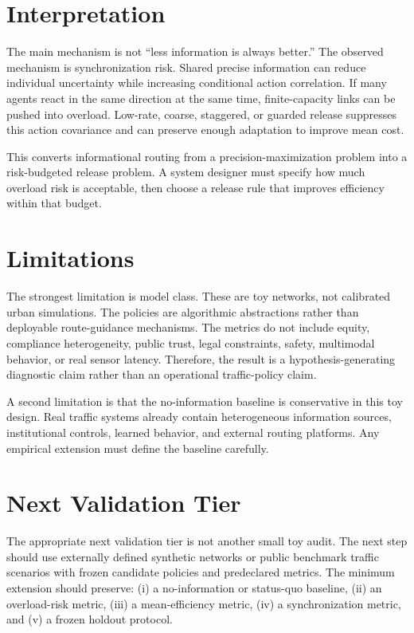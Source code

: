 \documentclass[11pt]{article}
\begin{document}
\section{Interpretation}
The main mechanism is not ``less information is always better.'' The observed mechanism is synchronization risk. Shared precise information can reduce individual uncertainty while increasing conditional action correlation. If many agents react in the same direction at the same time, finite-capacity links can be pushed into overload. Low-rate, coarse, staggered, or guarded release suppresses this action covariance and can preserve enough adaptation to improve mean cost.

This converts informational routing from a precision-maximization problem into a risk-budgeted release problem. A system designer must specify how much overload risk is acceptable, then choose a release rule that improves efficiency within that budget.

\section{Limitations}
The strongest limitation is model class. These are toy networks, not calibrated urban simulations. The policies are algorithmic abstractions rather than deployable route-guidance mechanisms. The metrics do not include equity, compliance heterogeneity, public trust, legal constraints, safety, multimodal behavior, or real sensor latency. Therefore, the result is a hypothesis-generating diagnostic claim rather than an operational traffic-policy claim.

A second limitation is that the no-information baseline is conservative in this toy design. Real traffic systems already contain heterogeneous information sources, institutional controls, learned behavior, and external routing platforms. Any empirical extension must define the baseline carefully.

\section{Next Validation Tier}
The appropriate next validation tier is not another small toy audit. The next step should use externally defined synthetic networks or public benchmark traffic scenarios with frozen candidate policies and predeclared metrics. The minimum extension should preserve: (i) a no-information or status-quo baseline, (ii) an overload-risk metric, (iii) a mean-efficiency metric, (iv) a synchronization metric, and (v) a frozen holdout protocol.
\end{document}
